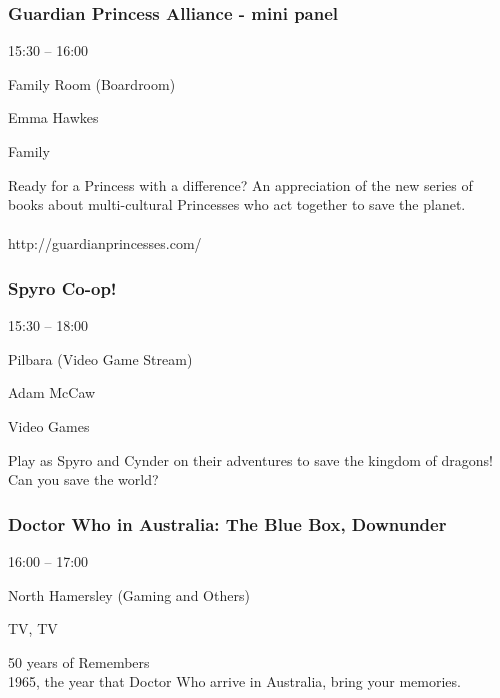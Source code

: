 \documentclass{scrreprt}
\begin{document}
\begin{multicols}{2}
\subsubsection*{Guardian Princess Alliance - mini panel}\begin{description}
\setlength{\itemsep}{0pt}
\setlength{\parsep}{0pt}
\setlength{\parskip}{0pt}
\item[Time:]{15:30 -- 16:00}
\item[Venue:]{Family Room (Boardroom)}
\item[People:]{Emma Hawkes}
\item[Tags:]{Family}\end{description}
Ready for a Princess with a difference? An appreciation of the new series of books about multi-cultural Princesses who act together to save the planet. \\\\http://guardianprincesses.com/
\subsubsection*{Spyro Co-op!}\begin{description}
\setlength{\itemsep}{0pt}
\setlength{\parsep}{0pt}
\setlength{\parskip}{0pt}
\item[Time:]{15:30 -- 18:00}
\item[Venue:]{Pilbara (Video Game Stream)}
\item[People:]{Adam McCaw}
\item[Tags:]{Video Games}\end{description}
Play as Spyro and Cynder on their adventures to save the kingdom of dragons! Can you save the world?
\subsubsection*{Doctor Who in Australia: The Blue Box, Downunder}\begin{description}
\setlength{\itemsep}{0pt}
\setlength{\parsep}{0pt}
\setlength{\parskip}{0pt}
\item[Time:]{16:00 -- 17:00}
\item[Venue:]{North Hamersley (Gaming and Others)}
\item[Tags:]{TV, TV}\end{description}
50 years of Remembers\\1965, the year that Doctor Who arrive in Australia, bring your memories.

\end{multicols}
\end{document}
